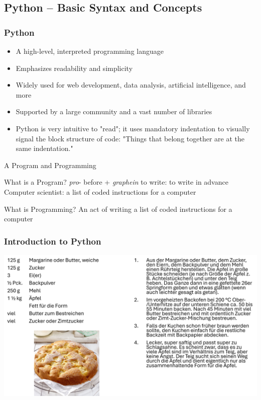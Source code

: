 \documentclass{beamer}
\begin{document}
\subsection{Python -- Basic Syntax and Concepts}
    \begin{frame}[fragile]
        \frametitle{Python}
        \begin{itemize}
            \item A high-level, interpreted programming language
            \item Emphasizes readability and simplicity
            \item Widely used for web development, data analysis, artificial intelligence, and more
            \item Supported by a large community and a vast number of libraries
            \item Python is very intuitive to "read"; it uses mandatory indentation to visually signal the block structure of code: "Things that belong together are at the same indentation."
        \end{itemize}
    \end{frame}

    \begin{frame}{A Program and Programming}
        \begin{block}{What is a Program?}
            \textit{pro}- before + \textit{graphein} to write: to write in advance \\
            Computer scientist: a list of coded instructions for a computer
        \end{block}
        \begin{block}{What is Programming?}
            An act of writing a list of coded instructions for a computer
        \end{block}
    \end{frame}

    \begin{frame}[fragile]
        \frametitle{Introduction to Python}
        \includegraphics[width=1\textwidth]{figures/Recipe.png}
    \end{frame}
\end{document}
